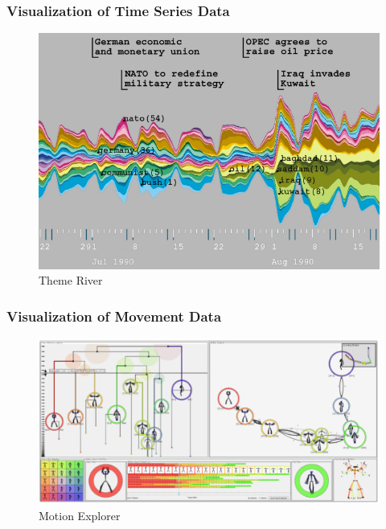 \documentclass{beamer}
\begin{document}

\begin{frame}
\frametitle{Visualization of Time Series Data}
\begin{figure}
\includegraphics[scale=0.5]{images/havre_themeriver.png}
\caption{Theme River}
\end{figure}
\end{frame}


\begin{frame}
\frametitle{Visualization of Movement Data}
\begin{figure}
\includegraphics[scale=0.4]{images/bernard_motionexplorer.png}
\caption{Motion Explorer}
\end{figure}
\end{frame}
\end{document}
